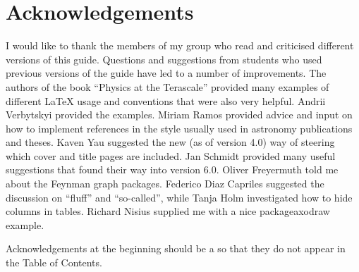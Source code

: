 \chapter*{Acknowledgements}%
\label{sec:ack1}

I would like to thank the members of my group who read and criticised
different versions of this guide. Questions and suggestions from
students who used previous versions of the guide have led to a number
of improvements. The authors of the book \enquote{Physics at the
Terascale} provided many examples of different \LaTeX{} usage and
conventions that were also very helpful.
Andrii Verbytskyi provided the \TikZ examples.
Miriam Ramos provided advice and input on how to implement references 
in the style usually used in astronomy publications and theses.
Kaven Yau suggested the new (as of version 4.0) way of steering which cover
and title pages are included.
Jan Schmidt provided many useful suggestions that found their way into version 6.0.
Oliver Freyermuth told me about the \TikZ Feynman graph packages.
Federico Diaz Capriles suggested the discussion on \enquote{fluff} and \enquote{so-called},
while Tanja Holm investigated how to hide columns in tables.
Richard Nisius supplied me with a nice package{axodraw} example.

Acknowledgements at the beginning should be a  so that they
do not appear in the Table of Contents.
